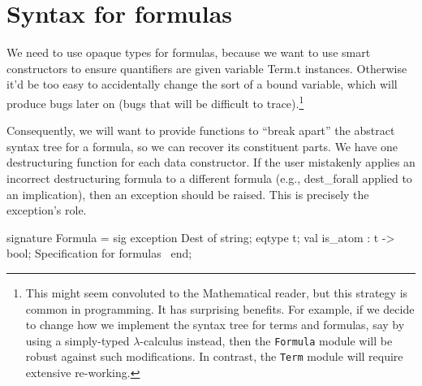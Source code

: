 
\section{Syntax for formulas}

\begin{node}
We need to use opaque types for formulas, because we want to use smart
constructors to ensure quantifiers are given variable {\Tt{}Term.t\nwendquote} instances.
Otherwise it'd be too easy to accidentally change the sort of a bound
variable, which will produce bugs later on (bugs that will be
difficult to trace).\footnote{This might seem convoluted to the
Mathematical reader, but this strategy is common in programming. It
has surprising benefits. For example, if we decide to change how we
implement the syntax tree for terms and formulas, say by using a
simply-typed $\lambda$-calculus instead, then the \texttt{Formula}
module will be robust against such modifications. In contrast, the
\texttt{Term} module will require extensive re-working.}

Consequently, we will want to provide  functions
to ``break apart'' the abstract syntax tree for a formula, so we can
recover its constituent parts. We have one destructuring function for
each data constructor. If the user mistakenly applies an incorrect
destructuring formula to a different formula (e.g., {\Tt{}dest{\_}forall\nwendquote}
applied to an implication), then an exception should be raised. This
is precisely the {\Tt{}\nwendquote} exception's role.
\end{node}

\nwenddocs{}\endmoddef\nwstartdeflinemarkup\nwenddeflinemarkup
signature Formula = sig
  exception Dest of string;
  eqtype t;
  val is_atom : t -> bool;
  \LA{}Specification for formulas~{\nwtagstyle{}}\RA{}
end;
\nwendcode{}\nwdocspar

